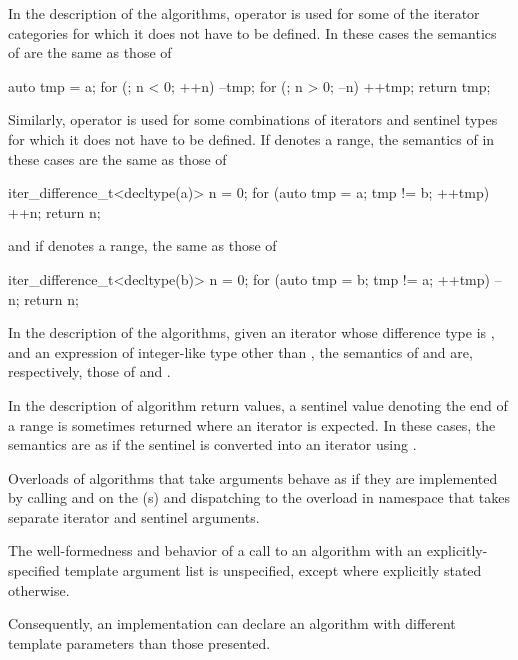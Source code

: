 \pnum
In the description of the algorithms, operator \tcode{+}
is used for some of the iterator categories
for which it does not have to be defined.
In these cases the semantics of  are the same as those of
\begin{codeblock}
auto tmp = a;
for (; n < 0; ++n) --tmp;
for (; n > 0; --n) ++tmp;
return tmp;
\end{codeblock}
Similarly, operator \tcode{-} is used
for some combinations of iterators and sentinel types
for which it does not have to be defined.
If  denotes a range,
the semantics of  in these cases are the same as those of
\begin{codeblock}
iter_difference_t<decltype(a)> n = 0;
for (auto tmp = a; tmp != b; ++tmp) ++n;
return n;
\end{codeblock}
and if  denotes a range, the same as those of
\begin{codeblock}
iter_difference_t<decltype(b)> n = 0;
for (auto tmp = b; tmp != a; ++tmp) --n;
return n;
\end{codeblock}

\pnum
In the description of the algorithms,
given an iterator  whose difference type is , and
an expression  of integer-like type other than \cv{} ,
the semantics of  and  are, respectively,
those of  and .

\pnum
In the description of algorithm return values,
a sentinel value  denoting the end of a range 
is sometimes returned where an iterator is expected.
In these cases,
the semantics are as if the sentinel is converted into an iterator using
.

\pnum
Overloads of algorithms that take  arguments
behave as if they are implemented by calling  and
 on the (s) and
dispatching to the overload in namespace 
that takes separate iterator and sentinel arguments.

\pnum
The well-formedness and behavior of a call to an algorithm with
an explicitly-specified template argument list
is unspecified, except where explicitly stated otherwise.
\begin{note}
Consequently, an implementation can declare an algorithm with
different template parameters than those presented.
\end{note}


